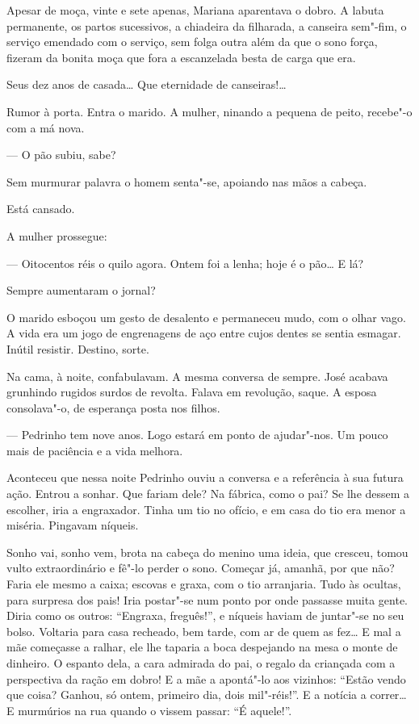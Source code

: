 Apesar de moça, vinte e sete apenas, Mariana aparentava o dobro. A
labuta permanente, os partos sucessivos, a chiadeira da filharada, a
canseira sem"-fim, o serviço emendado com o serviço, sem folga outra além
da que o sono força, fizeram da bonita moça que fora a escanzelada besta
de carga que era.

Seus dez anos de casada\ldots{} Que eternidade de canseiras!\ldots{}

Rumor à porta. Entra o marido. A mulher, ninando a pequena de peito,
recebe"-o com a má nova.

--- O pão subiu, sabe?

Sem murmurar palavra o homem senta"-se, apoiando nas mãos a cabeça.

Está cansado.

A mulher prossegue:

--- Oitocentos réis o quilo agora. Ontem foi a lenha; hoje é o pão\ldots{} E
lá?

Sempre aumentaram o jornal?

O marido esboçou um gesto de desalento e permaneceu mudo, com o olhar
vago. A vida era um jogo de engrenagens de aço entre cujos dentes se
sentia esmagar. Inútil resistir. Destino, sorte.

Na cama, à noite, confabulavam. A mesma conversa de sempre. José acabava
grunhindo rugidos surdos de revolta. Falava em revolução, saque. A
esposa consolava"-o, de esperança posta nos filhos.

--- Pedrinho tem nove anos. Logo estará em ponto de ajudar"-nos. Um pouco
mais de paciência e a vida melhora.

Aconteceu que nessa noite Pedrinho ouviu a conversa e a referência à sua
futura ação. Entrou a sonhar. Que fariam dele? Na fábrica, como o pai?
Se lhe dessem a escolher, iria a engraxador. Tinha um tio no ofício, e
em casa do tio era menor a miséria. Pingavam níqueis.

Sonho vai, sonho vem, brota na cabeça do menino uma ideia, que cresceu,
tomou vulto extraordinário e fê"-lo perder o sono. Começar já, amanhã,
por que não? Faria ele mesmo a caixa; escovas e graxa, com o tio
arranjaria. Tudo às ocultas, para surpresa dos pais! Iria postar"-se num
ponto por onde passasse muita gente. Diria como os outros: ``Engraxa,
freguês!'', e níqueis haviam de juntar"-se no seu bolso. Voltaria para
casa recheado, bem tarde, com ar de quem as fez\ldots{} E mal a mãe começasse
a ralhar, ele lhe taparia a boca despejando na mesa o monte de dinheiro.
O espanto dela, a cara admirada do pai, o regalo da criançada com a
perspectiva da ração em dobro! E a mãe a apontá"-lo aos vizinhos: ``Estão
vendo que coisa? Ganhou, só ontem, primeiro dia, dois mil"-réis!''. E a
notícia a correr\ldots{} E murmúrios na rua quando o vissem passar: ``É
aquele!''.

